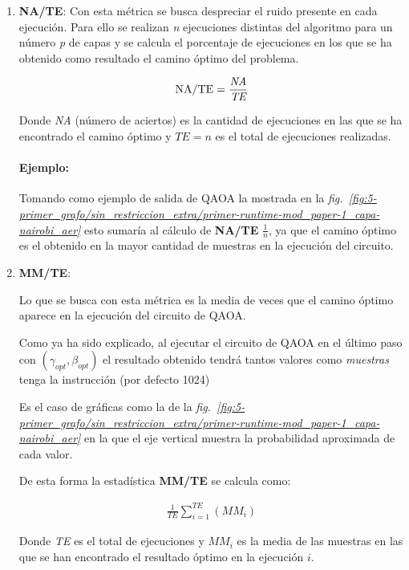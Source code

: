 \begin{enumerate}
\item \textbf{NA/TE}:
  Con esta métrica se busca despreciar el ruido presente en cada ejecución.
  Para ello se realizan \textit{n} ejecuciones distintas del algoritmo para un número \textit{p} de capas y se calcula el porcentaje de ejecuciones en los que se ha obtenido como resultado el camino óptimo del problema.

  \begin{align}
    \textnormal{NA/TE} = \frac{\textit{NA}}{\textit{TE}}
  \end{align}

  Donde \textit{NA} (número de aciertos) es la cantidad de ejecuciones en las que se ha encontrado el camino óptimo y $\textit{TE} = n$ es el total de ejecuciones realizadas.

  \paragraph{Ejemplo:}
  Tomando como ejemplo de salida de QAOA la mostrada en la \textit{fig.~\ref{fig:5-primer_grafo/sin_restriccion_extra/primer-runtime-mod_paper-1_capa-nairobi_aer}} esto sumaría al cálculo de \textbf{NA/TE} $\frac{1}{n}$, ya que el camino óptimo es el obtenido en la mayor cantidad de muestras en la ejecución del circuito.
  
\item \textbf{MM/TE}:

  Lo que se busca con esta métrica es la media de veces que el camino óptimo aparece en la ejecución del circuito de QAOA\@.

  Como ya ha sido explicado, al ejecutar el circuito de QAOA en el último paso con $(\gamma_{opt}, \beta_{opt})$ el resultado obtenido tendrá tantos valores como \textit{muestras} tenga la instrucción (por defecto 1024)

  Es el caso de gráficas como la de la \textit{fig.~\ref{fig:5-primer_grafo/sin_restriccion_extra/primer-runtime-mod_paper-1_capa-nairobi_aer}}
  en la que el eje vertical muestra la probabilidad aproximada de cada valor.

  De esta forma la estadística \textbf{MM/TE} se calcula como:

  \begin{align}
    \frac{1}{\textit{TE}} \sum_{i = 1}^\textit{TE} (\textit{MM}_i)
  \end{align}

  Donde \textit{TE} es el total de ejecuciones y $\textit{MM}_i$ es la media de las muestras en las que se han encontrado el resultado óptimo en la ejecución $i$.


\end{enumerate}
